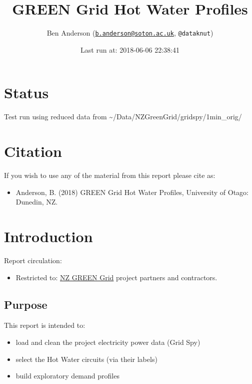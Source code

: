 \documentclass[]{article}
\title{GREEN Grid Hot Water Profiles}
\author{Ben Anderson
(\href{mailto:b.anderson@soton.ac.uk}{\nolinkurl{b.anderson@soton.ac.uk}},
\texttt{@dataknut})}
\date{Last run at: 2018-06-06 22:38:41}
\providecommand{\tightlist}{%
  \setlength{\itemsep}{0pt}\setlength{\parskip}{0pt}}
\begin{document}
\maketitle

{
\setcounter{tocdepth}{2}
\tableofcontents
}
\newpage

\section{Status}\label{status}

Test run using reduced data from
\textasciitilde{}/Data/NZGreenGrid/gridspy/1min\_orig/

\section{Citation}\label{citation}

If you wish to use any of the material from this report please cite as:

\begin{itemize}
\tightlist
\item
  Anderson, B. (2018) GREEN Grid Hot Water Profiles, University of
  Otago: Dunedin, NZ.
\end{itemize}

\newpage

\section{Introduction}\label{introduction}

Report circulation:

\begin{itemize}
\tightlist
\item
  Restricted to:
  \href{https://www.otago.ac.nz/centre-sustainability/research/energy/otago050285.html}{NZ
  GREEN Grid} project partners and contractors.
\end{itemize}

\subsection{Purpose}\label{purpose}

This report is intended to:

\begin{itemize}
\tightlist
\item
  load and clean the project electricity power data (Grid Spy)
\item
  select the Hot Water circuits (via their labels)
\item
  build exploratory demand profiles
\end{itemize}
\end{document}
